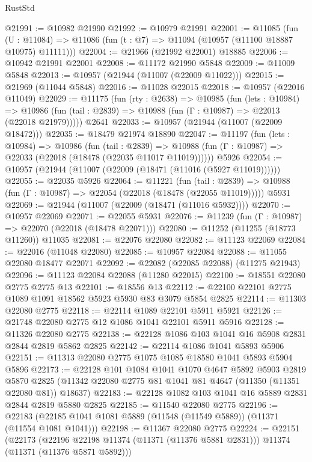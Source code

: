 \begin{lexlean}{RustStd}
\begin{coremodule}
@21991 := @10982 @21990
@21992 := @10979 @21991
@22001 := @11085
    (fun (U : @11084) => @11086 (fun (t : @7) => @11094 (@10957 (@11100 @18887 @10975) @11111)))
@22004 := @21966 (@21992 @22001) @18885
@22006 := @10942 @21991 @22001
@22008 := @11172 @21990 @5848
@22009 := @11009 @5848
@22013 := @10957 (@21944 (@11007 (@22009 @11022)))
@22015 := @21969 (@11044 @5848)
@22016 := @11028 @22015
@22018 := @10957 (@22016 @11049)
@22029 := @11175
    (fun (rty : @2638) =>
    @10985
      (fun (lets : @10984) =>
      @10986 (fun (tail : @2839) => @10988 (fun (Γ : @10987) => @22013 (@22018 @21979)))))
    @2641
@22033 := @10957 (@21944 (@11007 (@22009 @18472)))
@22035 := @18479 @21974 @18890
@22047 := @11197
    (fun (lets : @10984) =>
    @10986
      (fun (tail : @2839) =>
      @10988 (fun (Γ : @10987) => @22033 (@22018 (@18478 (@22035 @11017 @11019))))))
    @5926
@22054 := @10957 (@21944 (@11007 (@22009 (@18471 (@11016 (@5927 @11019))))))
@22055 := @22035 @5926
@22064 := @11221
    (fun (tail : @2839) => @10988 (fun (Γ : @10987) => @22054 (@22018 (@18478 (@22055 @11019)))))
    @5931
@22069 := @21944 (@11007 (@22009 (@18471 (@11016 @5932))))
@22070 := @10957 @22069
@22071 := @22055 @5931
@22076 := @11239 (fun (Γ : @10987) => @22070 (@22018 (@18478 @22071)))
@22080 := @11252 (@11255 (@18773 @11260)) @11035
@22081 := @22076 @22080
@22082 := @11123 @22069
@22084 := @22016 (@11048 @22080)
@22085 := @10957 @22084
@22088 := @11055 @22080 @18477 @22071
@22092 := @22082 (@22085 @22088) (@11275 @21943)
@22096 := @11123 @22084 @22088 (@11280 @22015)
@22100 := @18551 @22080 @2775 @2775 @13
@22101 := @18556 @13
@22112 := @22100 @22101 @2775 @1089 @1091 @18562 @5923 @5930 @83 @3079 @5854 @2825
@22114 := @11303 @22080 @2775
@22118 := @22114 @1089 @22101 @5911 @5921
@22126 := @21748 @22080 @2775 @12 @1086 @1041 @22101 @5911 @5916
@22128 := @11326 @22080 @2775
@22138 := @22128 @1086 @103 @1041 @16 @5908 @2831 @2844 @2819 @5862 @2825
@22142 := @22114 @1086 @1041 @5893 @5906
@22151 := @11313 @22080 @2775 @1075 @1085 @18580 @1041 @5893 @5904 @5896
@22173 := @22128
    @101
    @1084
    @1041
    @1070
    @4647
    @5892
    @5903
    @2819
    @5870
    @2825
    (@11342 @22080 @2775 @81 @1041 @81 @4647 (@11350 (@11351 @22080 @81)) @18637)
@22183 := @22128 @1082 @103 @1041 @16 @5889 @2831 @2844 @2819 @5880 @2825
@22185 := @11540 @22080 @2775
@22196 := @22183 (@22185 @1041 @1081 @5889 (@11548 (@11549 @5889)) (@11371 (@11554 @1081 @1041)))
@22198 := @11367 @22080 @2775
@22224 := @22151
    (@22173
      (@22196 @22198 @11374 (@11371 (@11376 @5881 @2831)))
      @11374
      (@11371 (@11376 @5871 @5892)))

\end{coremodule}
\end{lexlean}
